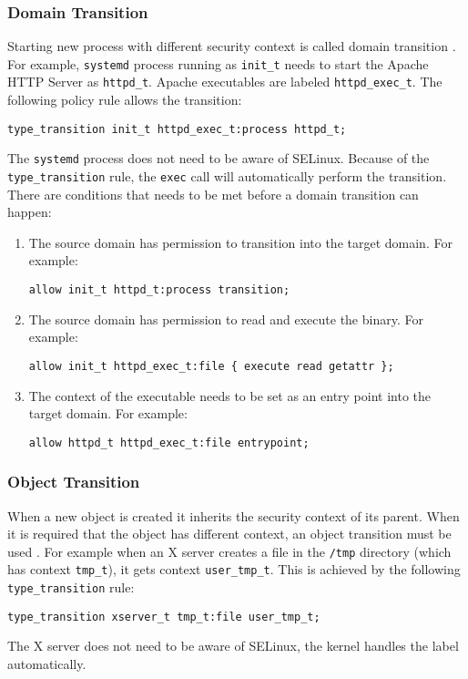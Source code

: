 \subsubsection{Domain Transition}
Starting new process with different security context is called domain transition
\cite[pp.~43--47]{tsn}. For example, \texttt{systemd} process running as
\texttt{init\_t} needs to start the Apache HTTP Server as \texttt{httpd\_t}.
Apache executables are labeled \texttt{httpd\_exec\_t}. The following policy
rule allows the transition:
\begin{lstlisting}[language=te]
type_transition init_t httpd_exec_t:process httpd_t;
\end{lstlisting}
The \texttt{systemd} process does not need to be aware of SELinux. Because of
the \texttt{type\_transition} rule, the \texttt{exec} call will automatically
perform the transition. There are conditions that needs to be met before a
domain transition can happen:
\begin{enumerate}
    \item The source domain has permission to transition into the target domain.
        For example:
\begin{lstlisting}[language=te]
allow init_t httpd_t:process transition;
\end{lstlisting}
    \item The source domain has permission to read and execute the binary. For
        example:
\begin{lstlisting}[language=te]
allow init_t httpd_exec_t:file { execute read getattr };
\end{lstlisting}
    \item The context of the executable needs to be set as an entry point into
        the target domain. For example:
\begin{lstlisting}[language=te]
allow httpd_t httpd_exec_t:file entrypoint;
\end{lstlisting}
\end{enumerate}

\subsubsection{Object Transition}
When a new object is created it inherits the security context of its parent.
When it is required that the object has different context, an object transition
must be used \cite[pp.~47--48]{tsn}. For example when an X server creates a file
in the \texttt{/tmp} directory (which has context \texttt{tmp\_t}), it gets
context \texttt{user\_tmp\_t}. This is achieved by the following
\texttt{type\_transition} rule:
\begin{lstlisting}[language=te]
type_transition xserver_t tmp_t:file user_tmp_t;
\end{lstlisting}
The X server does not need to be aware of SELinux, the kernel handles the label
automatically.

